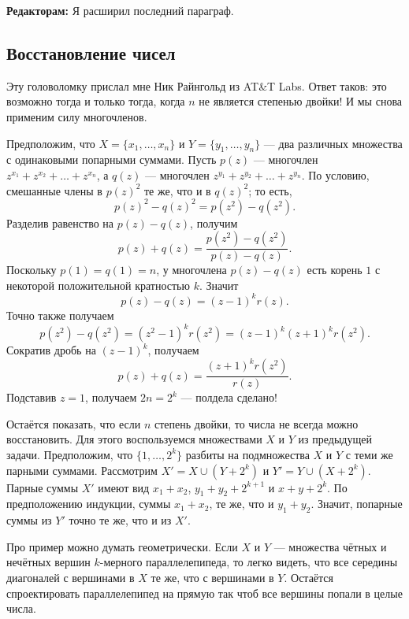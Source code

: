 \begin{addedbytheeditors}
\textbf{Редакторам:} Я расширил последний параграф.
\end{addedbytheeditors}

\subsection*{Восстановление чисел}

Эту головоломку прислал мне Ник Райнгольд из AT\&T Labs.
Ответ таков: это возможно тогда и только тогда, когда $n$ не является степенью двойки!
И мы снова применим силу многочленов.

Предположим, что $X = \{x_1 , \dots , x_n\}$ и $Y = \{y_1 , \dots , y_n\}$ --- два различных множества с одинаковыми попарными суммами.
Пусть $p(z)$ --- многочлен $z^{x_1} + z^{x_2} + \dots + z^{x_n}$,
а $q(z)$ --- многочлен $z^{y_1} + z^{y_2} + \dots + z^{y_n}$.
По условию, смешанные члены в $p(z)^2$ те же, что и в $q(z)^2$;
то есть,
\[p(z)^2 -q(z)^2 = p(z^2 )-q(z^2).\]
Разделив равенство на $p(z) - q(z)$, получим
\[p(z) + q(z) =
\frac{p(z^2 ) - q(z^2 )}{p(z) - q(z)}.
\]
Поскольку $p(1) = q(1) = n$,
у многочлена $p(z) - q(z)$ есть корень $1$ с некоторой положительной кратностью $k$.
Значит
\[p(z) - q(z) = (z - 1)^k r(z).\]
Точно также получаем
\[p(z^2 ) - q(z^2 ) = (z^2 - 1)^k r(z^2 )= (z - 1)^k (z + 1)^k r(z^2).\]
Сократив дробь на $(z - 1)^k$, получаем
\[p(z) + q(z) =
\frac{(z + 1)^k r(z^2)}{r(z)}.
\]
Подставив $z = 1$, получаем $2n = 2^k$ --- полдела сделано!

Остаётся показать, что если $n$ степень двойки, то
числа не всегда можно восстановить.
Для этого воспользуемся множествами $X$ и $Y$ из предыдущей задачи.
Предположим, что $\{1, \dots , 2^k\}$ разбиты на подмножества $X$ и $Y$ с теми же парными суммами.
Рассмотрим $X' = X \cup (Y + 2^k)$ и $Y' = Y \cup (X + 2^k)$.
Парные суммы $X'$ имеют вид $x_1 + x_2$, $y_1 + y_2 + 2^{k+1}$ и $x + y + 2^k$.
По предположению индукции,
суммы $x_1 + x_2$, те же, что и $y_1 + y_2$.
Значит, попарные суммы из $Y'$ точно те же, что и из $X'$.

\begin{addedbytheeditors}
Про пример можно думать геометрически.
Если $X$ и $Y$ --- множества чётных и нечётных вершин $k$-мерного параллелепипеда, то легко видеть, что все середины диагоналей с вершинами в $X$ те же, что с вершинами в $Y$.
Остаётся спроектировать параллелепипед на прямую так чтоб все вершины попали в целые числа.
\end{addedbytheeditors}

